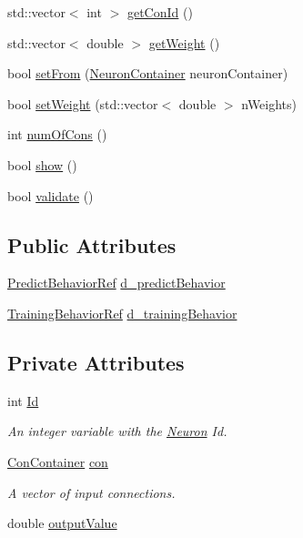 \begin{DoxyCompactItemize}
\item 
std::vector$<$ int $>$ \hyperlink{class_neuron_acb4a225069611af4aa1723170e196e82}{getConId} ()
\item 
std::vector$<$ double $>$ \hyperlink{class_neuron_a8c0ab449acb35177af8d89651e49f357}{getWeight} ()
\item 
bool \hyperlink{class_neuron_ac8129f5de3ec1c143f40d507b6843649}{setFrom} (\hyperlink{class_neuron_container}{NeuronContainer} neuronContainer)
\item 
bool \hyperlink{class_neuron_a93b27c179c576758ff437b9273b95041}{setWeight} (std::vector$<$ double $>$ nWeights)
\item 
int \hyperlink{class_neuron_ae447dce39ed04581609a83d742b585d1}{numOfCons} ()
\item 
bool \hyperlink{class_neuron_a255c3597520c730d798218f7174eff1b}{show} ()
\item 
bool \hyperlink{class_neuron_a95327aa80a9ec949491f214a0c159b5a}{validate} ()
\end{DoxyCompactItemize}
\subsection*{Public Attributes}
\begin{DoxyCompactItemize}
\item 
\hyperlink{_a_m_o_r_e_8h_aff87e1c27cc15df9f3364b7cf29c85ea}{PredictBehaviorRef} \hyperlink{class_neuron_a6bdb3e83c3b897560dcd84a3ca0f0eb9}{d\_\-predictBehavior}
\item 
\hyperlink{_a_m_o_r_e_8h_a2efd5ce2c834a4c9e92cd98bbb887225}{TrainingBehaviorRef} \hyperlink{class_neuron_a0580299ae79817ffe24f5d0f9bd26a68}{d\_\-trainingBehavior}
\end{DoxyCompactItemize}
\subsection*{Private Attributes}
\begin{DoxyCompactItemize}
\item 
int \hyperlink{class_neuron_a72bb327a7c5c865e6748a4e074ce0680}{Id}
\begin{DoxyCompactList}\small\item\em An integer variable with the \hyperlink{class_neuron}{Neuron} Id. \end{DoxyCompactList}\item 
\hyperlink{class_con_container}{ConContainer} \hyperlink{class_neuron_a1e92229eb19c3f322e118bdf23b9844e}{con}
\begin{DoxyCompactList}\small\item\em A vector of input connections. \end{DoxyCompactList}\item 
double \hyperlink{class_neuron_ada029047646c36e525a6a1b77cafc03c}{outputValue}
\end{DoxyCompactItemize}


